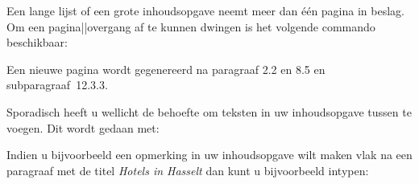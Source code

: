 Een lange lijst of een grote inhoudsopgave neemt meer dan
\'e\'en pagina in beslag. Om een pagina||overgang af te kunnen
dwingen is het volgende commando beschikbaar:

\starttypen
\volledigeinhoud[2.2,8.5,12.3.3]
\stoptypen

Een nieuwe pagina wordt gegenereerd na paragraaf 2.2 en 8.5
en subparagraaf~12.3.3.

Sporadisch heeft u wellicht de behoefte om teksten in uw
inhoudsopgave tussen te voegen. Dit wordt gedaan met:


Indien u bijvoorbeeld een opmerking in uw inhoudsopgave wilt
maken vlak na een paragraaf met de titel {\em Hotels in
Hasselt} dan kunt u bijvoorbeeld intypen:

\startbuffer
{}
\schrijftussenlijst[paragraaf]{\blanko}
\schrijftussenlijst[paragraaf]{\blanko}
\stopbuffer

\typebuffer

\stoponderdeel
